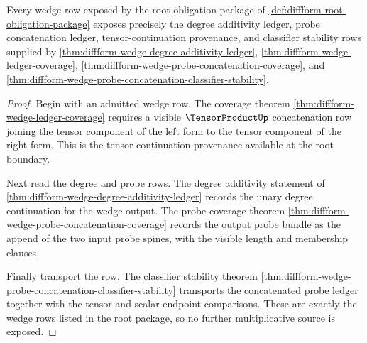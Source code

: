 \begin{theorem}
\label{thm:diffform-root-wedge-probe-obligation}
Every wedge row exposed by the root obligation package of
\autoref{def:diffform-root-obligation-package} exposes precisely the degree
additivity ledger, probe concatenation ledger, tensor-continuation
provenance, and classifier stability rows supplied by
\autoref{thm:diffform-wedge-degree-additivity-ledger},
\autoref{thm:diffform-wedge-ledger-coverage},
\autoref{thm:diffform-wedge-probe-concatenation-coverage}, and
\autoref{thm:diffform-wedge-probe-concatenation-classifier-stability}.
\end{theorem}
\begin{proof}
Begin with an admitted wedge row. The coverage theorem
\autoref{thm:diffform-wedge-ledger-coverage} requires a visible
$\TensorProductUp$ concatenation row joining the tensor component of the left
form to the tensor component of the right form. This is the tensor
continuation provenance available at the root boundary.

Next read the degree and probe rows. The degree additivity statement of
\autoref{thm:diffform-wedge-degree-additivity-ledger} records the unary
degree continuation for the wedge output. The probe coverage theorem
\autoref{thm:diffform-wedge-probe-concatenation-coverage} records the output
probe bundle as the append of the two input probe spines, with the visible
length and membership clauses.

Finally transport the row. The classifier stability theorem
\autoref{thm:diffform-wedge-probe-concatenation-classifier-stability}
transports the concatenated probe ledger together with the tensor and scalar
endpoint comparisons. These are exactly the wedge rows listed in the root
package, so no further multiplicative source is exposed.
\end{proof}

